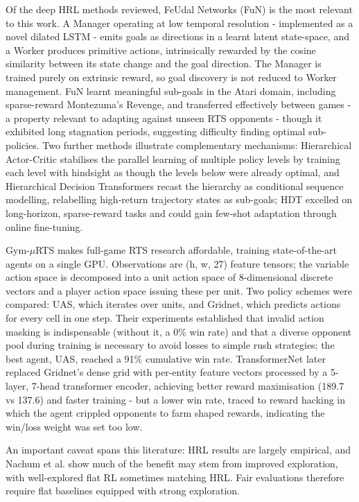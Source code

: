\documentclass[sigconf,review=false]{acmart}
\begin{document}
Of the deep HRL methods reviewed, FeUdal Networks (FuN) \cite{FuN} is the most relevant to this work. 
A Manager operating at low temporal resolution - implemented as a novel dilated LSTM - emits goals as directions in a learnt latent state-space, and a Worker produces primitive actions, intrinsically rewarded by the cosine similarity between its state change and the goal direction. 
The Manager is trained purely on extrinsic reward, so goal discovery is not reduced to Worker management. 
FuN learnt meaningful sub-goals in the Atari domain, including sparse-reward Montezuma's Revenge, and transferred effectively between games - a property relevant to adapting against unseen RTS opponents - though it exhibited long stagnation periods, suggesting difficulty finding optimal sub-policies. 
Two further methods illustrate complementary mechanisms: Hierarchical Actor-Critic \cite{HAC} stabilises the parallel learning of multiple policy levels by training each level with hindsight as though the levels below were already optimal, and Hierarchical Decision Transformers \cite{DT-HRL} recast the hierarchy as conditional sequence modelling, relabelling high-return trajectory states as sub-goals; HDT excelled on long-horizon, sparse-reward tasks and could gain few-shot adaptation through online fine-tuning.

Gym-$\mu$RTS \cite{microrts, micrortsgridnet} makes full-game RTS research affordable, training state-of-the-art agents on a single GPU. 
Observations are (h, w, 27) feature tensors; the variable action space is decomposed into a unit action space of 8-dimensional discrete vectors and a player action space issuing these per unit. Two policy schemes were compared: UAS, which iterates over units, and Gridnet, which predicts actions for every cell in one step.
Their experiments established that invalid action masking is indispensable (without it, a 0\% win rate) and that a diverse opponent pool during training is necessary to avoid losses to simple rush strategies; the best agent, UAS, reached a 91\% cumulative win rate. 
TransformerNet \cite{transformernet} later replaced Gridnet's dense grid with per-entity feature vectors processed by a 5-layer, 7-head transformer encoder, achieving better reward maximisation (189.7 vs 137.6) and faster training - but a lower win rate, traced to reward hacking in which the agent crippled opponents to farm shaped rewards, indicating the win/loss weight was set too low.

An important caveat spans this literature: HRL results are largely empirical, and Nachum et al. \cite{badhrl} show much of the benefit may stem from improved exploration, with well-explored flat RL sometimes matching HRL. 
Fair evaluations therefore require flat baselines equipped with strong exploration. 
\end{document}
